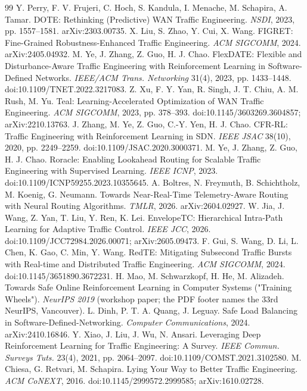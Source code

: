 \documentclass[journal]{IEEEtran}
\begin{document}
\begin{thebibliography}{99}
 Y. Perry, F. V. Frujeri, C. Hoch, S. Kandula, I. Menache, M. Schapira, A. Tamar. DOTE: Rethinking (Predictive) WAN Traffic Engineering. \textit{NSDI}, 2023, pp. 1557--1581. arXiv:2303.00735.
 X. Liu, S. Zhao, Y. Cui, X. Wang. FIGRET: Fine-Grained Robustness-Enhanced Traffic Engineering. \textit{ACM SIGCOMM}, 2024. arXiv:2405.04932.
 M. Ye, J. Zhang, Z. Guo, H. J. Chao. FlexDATE: Flexible and Disturbance-Aware Traffic Engineering with Reinforcement Learning in Software-Defined Networks. \textit{IEEE/ACM Trans. Networking} 31(4), 2023, pp. 1433--1448. doi:10.1109/TNET.2022.3217083.
 Z. Xu, F. Y. Yan, R. Singh, J. T. Chiu, A. M. Rush, M. Yu. Teal: Learning-Accelerated Optimization of WAN Traffic Engineering. \textit{ACM SIGCOMM}, 2023, pp. 378--393. doi:10.1145/3603269.3604857; arXiv:2210.13763.
 J. Zhang, M. Ye, Z. Guo, C.-Y. Yen, H. J. Chao. CFR-RL: Traffic Engineering with Reinforcement Learning in SDN. \textit{IEEE JSAC} 38(10), 2020, pp. 2249--2259. doi:10.1109/JSAC.2020.3000371.
 M. Ye, J. Zhang, Z. Guo, H. J. Chao. Roracle: Enabling Lookahead Routing for Scalable Traffic Engineering with Supervised Learning. \textit{IEEE ICNP}, 2023. doi:10.1109/ICNP59255.2023.10355645.
 A. Boltres, N. Freymuth, B. Schichtholz, M. Koenig, G. Neumann. Towards Near-Real-Time Telemetry-Aware Routing with Neural Routing Algorithms. \textit{TMLR}, 2026. arXiv:2604.02927.
 W. Jia, J. Wang, Z. Yan, T. Liu, Y. Ren, K. Lei. EnvelopeTC: Hierarchical Intra-Path Learning for Adaptive Traffic Control. \textit{IEEE JCC}, 2026. doi:10.1109/JCC72984.2026.00071; arXiv:2605.09473.
 F. Gui, S. Wang, D. Li, L. Chen, K. Gao, C. Min, Y. Wang. RedTE: Mitigating Subsecond Traffic Bursts with Real-time and Distributed Traffic Engineering. \textit{ACM SIGCOMM}, 2024. doi:10.1145/3651890.3672231.
 H. Mao, M. Schwarzkopf, H. He, M. Alizadeh. Towards Safe Online Reinforcement Learning in Computer Systems ("Training Wheels"). \textit{NeurIPS 2019} (workshop paper; the PDF footer names the 33rd NeurIPS, Vancouver).
 L. Dinh, P. T. A. Quang, J. Leguay. Safe Load Balancing in Software-Defined-Networking. \textit{Computer Communications}, 2024. arXiv:2410.16846.
 Y. Xiao, J. Liu, J. Wu, N. Ansari. Leveraging Deep Reinforcement Learning for Traffic Engineering: A Survey. \textit{IEEE Commun. Surveys Tuts.} 23(4), 2021, pp. 2064--2097. doi:10.1109/COMST.2021.3102580.
 M. Chiesa, G. Retvari, M. Schapira. Lying Your Way to Better Traffic Engineering. \textit{ACM CoNEXT}, 2016. doi:10.1145/2999572.2999585; arXiv:1610.02728.

\end{thebibliography}
\end{document}
